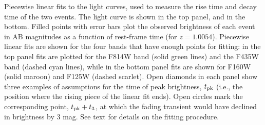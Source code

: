 Piecewise linear fits to the \spock light curves, used to measure the
rise time and decay time of the two events.  The \spockone light curve
is shown in the top panel, and \spocktwo in the bottom. Filled points
with error bars plot the observed brightness of each event in AB
magnitudes as a function of rest-frame time (for
$z=1.0054$). Piecewise linear fits are shown for the four bands that
have enough points for fitting: in the top panel fits are plotted for
the F814W band (solid green lines) and the F435W band (dashed cyan
lines), while in the bottom panel fits are shown for F160W (solid
maroon) and F125W (dashed scarlet).  Open diamonds in each panel show
three examples of assumptions for the time of peak brightness, $t_{\rm
pk}$ (i.e., the position where the rising piece of the linear fit
ends).  Open circles mark the corresponding point, $t_{\rm pk} + t_3$,
at which the fading transient would have declined in brightness by 3
mag.  See text for details on the fitting procedure.
\label{fig:LinearLightCurveFits}
